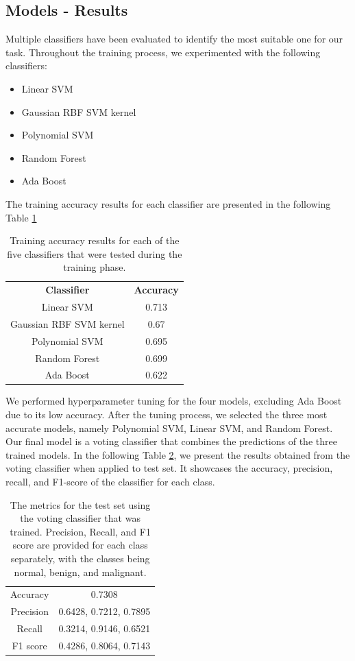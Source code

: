 \subsection{Models - Results}
Multiple classifiers have been evaluated to identify the most suitable one for our task. Throughout the training process, we experimented with the following classifiers:
\begin{itemize}
\item Linear SVM
\item Gaussian RBF SVM kernel
\item Polynomial SVM
\item Random Forest
\item Ada Boost
\end{itemize}
The training accuracy results for each classifier are presented in the following Table \ref{Table - ML_Classification Training accuracy results for each of the 5 classifiers that have been tested}
\begin{table}[H]
\centering
\begin{tabular}{cc}
\textbf{Classifier}     & \textbf{Accuracy} \\
Linear SVM              & 0.713             \\
Gaussian RBF SVM kernel & 0.67              \\
Polynomial SVM          & 0.695             \\
Random Forest           & 0.699             \\
Ada Boost               & 0.622            
\end{tabular}
\caption{Training accuracy results for each of the five classifiers that were tested during the training phase.}
\label{Table - ML_Classification Training accuracy results for each of the 5 classifiers that have been tested}
\end{table}
We performed hyperparameter tuning for the four models, excluding Ada Boost due to its low accuracy. After the tuning process, we selected the three most accurate models, namely Polynomial SVM, Linear SVM, and Random Forest. Our final model is a voting classifier that combines the predictions of the three trained models. In the following Table \ref{Table - ML_Classification Test accuracy-precision-recall-f1 results for voting classifier}, we present the results obtained from the voting classifier when applied to test set. It showcases the accuracy, precision, recall, and F1-score of the classifier for each class.
\begin{table}[H]
\centering
\begin{tabular}{cc}
Accuracy  & 0.7308                 \\
Precision & 0.6428, 0.7212, 0.7895 \\
Recall    & 0.3214, 0.9146, 0.6521 \\
F1 score  & 0.4286, 0.8064, 0.7143
\end{tabular}
\caption{The metrics for the test set using the voting classifier that was trained. Precision, Recall, and F1 score are provided for each class separately, with the classes being normal, benign, and malignant.}
\label{Table - ML_Classification Test accuracy-precision-recall-f1 results for voting classifier}
\end{table}

